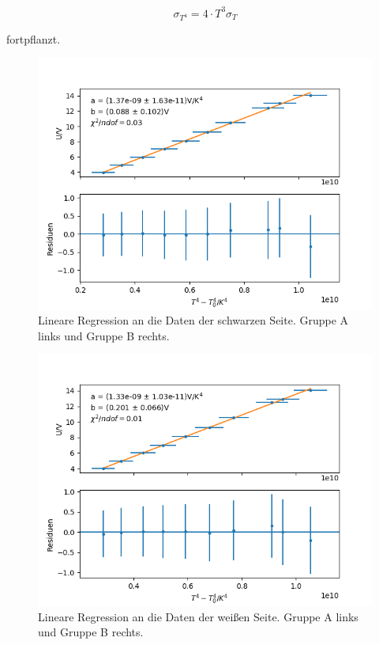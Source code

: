 \documentclass[12pt,a4paper]{article}
\begin{document}
\begin{equation}
\sigma_{T^4} = 4 \cdot T^3 \sigma_T
\end{equation}

fortpflanzt.

\begin{figure}
\includegraphics[scale=0.5]{Bilder/Schwarz_A}
\caption{Lineare Regression an die Daten der schwarzen Seite. Gruppe A links und Gruppe B rechts.}
\label{fig:RegSchwarz}
\end{figure}

\begin{figure}
\includegraphics[scale=0.5]{Bilder/Weiss_A}
\caption{Lineare Regression an die Daten der weißen Seite. Gruppe A links und Gruppe B rechts.}
\label{fig:RegWeiss}
\end{figure}
\end{document}
